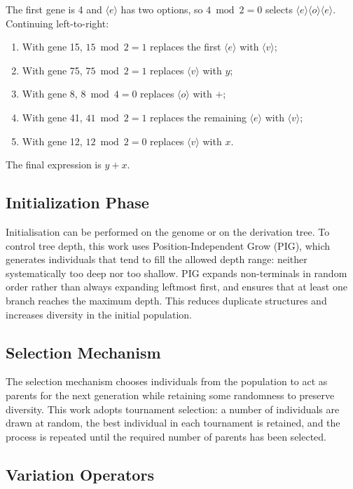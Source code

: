 The first gene is 4 and $\langle e \rangle$ has two options, so $4 \bmod 2 = 0$ selects $\langle e \rangle \langle o \rangle \langle e \rangle$.
Continuing left-to-right:
\begin{enumerate}
    \item With gene 15, $15 \bmod 2 = 1$ replaces the first $\langle e \rangle$ with $\langle v \rangle$;
    \item With gene 75, $75 \bmod 2 = 1$ replaces $\langle v \rangle$ with $y$;
    \item With gene 8, $8 \bmod 4 = 0$ replaces $\langle o \rangle$ with $+$;
    \item With gene 41, $41 \bmod 2 = 1$ replaces the remaining $\langle e \rangle$ with $\langle v \rangle$;
    \item With gene 12, $12 \bmod 2 = 0$ replaces $\langle v \rangle$ with $x$.
\end{enumerate}
The final expression is $y + x$.

\subsection{Initialization Phase}

Initialisation can be performed on the genome or on the derivation tree.
To control tree depth, this work uses Position-Independent Grow (\ac{PIG}), which generates individuals that tend to fill the allowed depth range: neither systematically too deep nor too shallow.
\ac{PIG} expands non-terminals in random order rather than always expanding leftmost first, and ensures that at least one branch reaches the maximum depth.
This reduces duplicate structures and increases diversity in the initial population.

\subsection{Selection Mechanism}

The selection mechanism chooses individuals from the population to act as parents for the next generation while retaining some randomness to preserve diversity.
This work adopts tournament selection: a number of individuals are drawn at random, the best individual in each tournament is retained, and the process is repeated until the required number of parents has been selected.

\subsection{Variation Operators}

